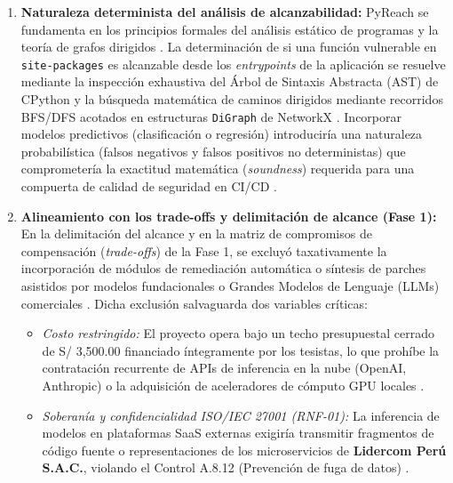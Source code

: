 \begin{enumerate}
    \item \textbf{Naturaleza determinista del análisis de alcanzabilidad:} 
    PyReach se fundamenta en los principios formales del análisis estático de programas y la teoría de grafos dirigidos \cite{nielson1999principles, ryder1979constructing}. La determinación de si una función vulnerable en \texttt{site-\allowbreak packages} es alcanzable desde los \textit{entrypoints} de la aplicación se resuelve mediante la inspección exhaustiva del Árbol de Sintaxis Abstracta (AST) de CPython y la búsqueda matemática de caminos dirigidos mediante recorridos BFS/DFS acotados en estructuras \texttt{DiGraph} de NetworkX \cite{salis2021pycg, hagberg2008exploring}. Incorporar modelos predictivos (clasificación o regresión) introduciría una naturaleza probabilística (falsos negativos y falsos positivos no deterministas) que comprometería la exactitud matemática (\textit{soundness}) requerida para una compuerta de calidad de seguridad en CI/CD \cite{pashchenko2022vuln4real, humble2010continuous}.

    \item \textbf{Alineamiento con los trade-offs y delimitación de alcance (Fase 1):} 
    En la delimitación del alcance y en la matriz de compromisos de compensación (\textit{trade-offs}) de la Fase 1, se excluyó taxativamente la incorporación de módulos de remediación automática o síntesis de parches asistidos por modelos fundacionales o Grandes Modelos de Lenguaje (LLMs) comerciales \cite{bogart2016break, torres2026proyecto}. Dicha exclusión salvaguarda dos variables críticas:
    \begin{itemize}
        \item \textit{Costo restringido:} El proyecto opera bajo un techo presupuestal cerrado de S/ 3,500.00 financiado íntegramente por los tesistas, lo que prohíbe la contratación recurrente de APIs de inferencia en la nube (OpenAI, Anthropic) o la adquisición de aceleradores de cómputo GPU locales \cite{torres2026proyecto}.
        \item \textit{Soberanía y confidencialidad ISO/IEC 27001 (RNF-01):} La inferencia de modelos en plataformas SaaS externas exigiría transmitir fragmentos de código fuente o representaciones de los microservicios de \textbf{Lidercom Perú S.A.C.}, violando el Control A.8.12 (Prevención de fuga de datos) \cite{ladisa2023sok, gutierrez2024auditoria}.
    \end{itemize}
\end{enumerate}

